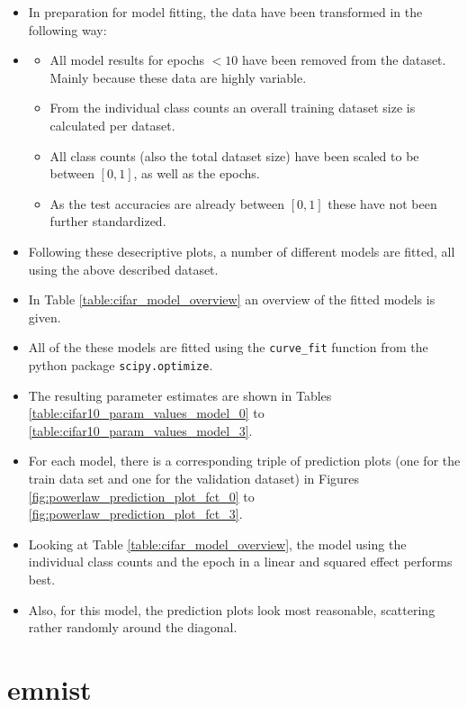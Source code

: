 \documentclass{article} %
\begin{document}
\begin{itemize}
    \item In preparation for model fitting, the data have been transformed in the following way:
    \item \begin{itemize}
              \item All model results for epochs $< 10$ have been removed from the dataset. Mainly because these data are highly variable.
              \item From the individual class counts an overall training dataset size is calculated per dataset.
              \item All class counts (also the total dataset size) have been scaled to be between $[0, 1]$, as well as the epochs.
              \item As the test accuracies are already between $[0,1]$ these have not been further standardized.
          \end{itemize}
    \item Following these desecriptive plots, a number of different models are fitted, all using the above described dataset.
    \item In Table \ref{table:cifar_model_overview} an overview of the fitted models is given.
    \item All of the these models are fitted using the \verb|curve_fit| function from the python package \verb|scipy.optimize|.
    \item The resulting parameter estimates are shown in Tables \ref{table:cifar10_param_values_model_0} to \ref{table:cifar10_param_values_model_3}.
    \item For each model, there is a corresponding triple of prediction plots (one for the train data set and one for the validation dataset) in Figures \ref{fig:powerlaw_prediction_plot_fct_0} to \ref{fig:powerlaw_prediction_plot_fct_3}.
    \item Looking at Table \ref{table:cifar_model_overview}, the model using the individual class counts and the epoch in a linear and squared effect performs best.
    \item Also, for this model, the prediction plots look most reasonable, scattering rather randomly around the diagonal.
\end{itemize}


\section{emnist}
\end{document}

